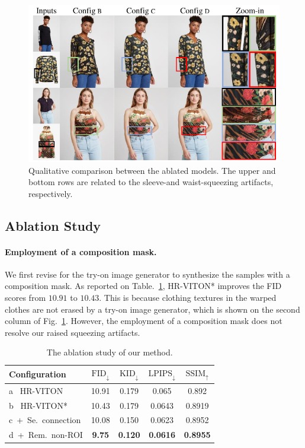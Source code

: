\documentclass[letterpaper]{article} %
\begin{document}
\begin{figure}[t!]
	\centering
    \includegraphics[width=\linewidth]{fig/fig6.pdf}
    \caption{Qualitative comparison between the ablated models. The upper and bottom rows are related to the sleeve-and waist-squeezing artifacts, respectively.}
	\label{ablation}
\end{figure}

\subsection{Ablation Study}

\paragraph{Employment of a composition mask.} We first revise for the try-on image generator to synthesize the samples with a composition mask.
As reported on Table.~\ref{tb_ablation_study}, HR-VITON* improves the FID scores from $10.91$ to $10.43$.
This is because clothing textures in the warped clothes are not erased by a try-on image generator, which is shown on the second column of Fig.~\ref{ablation}.
However, the employment of a composition mask does not resolve our raised squeezing artifacts.

\begin{table}[t]
\centering
\begin{tabular}{l|cc|cc}
		\toprule
		Configuration & $\text{FID}_\downarrow$ & $\text{KID}_\downarrow$ & $\text{LPIPS}_\downarrow$ & $\text{SSIM}_\uparrow$  \\
		\midrule
		\midrule
		{\sc a}~ HR-VITON	& 10.91 & 0.179 & 0.065 & 0.892   \\
        {\sc b}~ HR-VITON*  & 10.43 & 0.179 & 0.0643 & 0.8919 \\
        {\sc c}~+~Se.~connection & 10.08 & 0.150 & 0.0623 & 0.8952 \\
        {\sc d}~+~Rem.~non-ROI & \textbf{9.75} & \textbf{0.120} & \textbf{0.0616} & \textbf{0.8955} \\
		\bottomrule
	\end{tabular}
\caption{The ablation study of our method.}
\label{tb_ablation_study}
\end{table}
\end{document}
